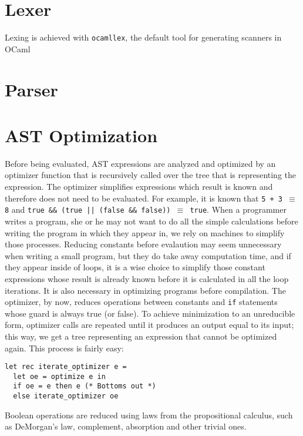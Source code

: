 \documentclass[a4paper, 11pt]{article}
\begin{document}
\begin{multicols}{2}

\section{Lexer}

Lexing is achieved with \texttt{ocamllex}, the default tool for generating
scanners in OCaml

\section{Parser}

\section{AST Optimization}
Before being evaluated, AST expressions are analyzed and optimized by an
optimizer function that is recursively called over the tree that is representing
the expression. The optimizer simplifies expressions which result is known and
therefore does not need to be evaluated. For example, it is known that \texttt{5
+ 3 $\equiv$ 8} and \texttt{true \&\& (true || (false \&\& false)) $\equiv$
true}. When a programmer writes a program, she or he may not want to do all the
simple calculations before writing the program in which they appear in, we rely
on machines to simplify those processes. Reducing constants before evalaution
may seem unnecessary when writing a small program, but they do take away
computation time, and if they appear inside of loops, it is a wise choice to
simplify those constant expressions whose result is already known before it is
calculated in all the loop iterations. It is also necessary in optimizing
programs before compilation. The optimizer, by now, reduces operations between
constants and \texttt{if} statements whose guard is always true (or false). To
achieve minimization to an unreducible form, optimizer calls are repeated until
it produces an output equal to its input; this way, we get a tree representing
an expression that cannot be optimized again. This process is fairly easy:

\begin{lstlisting}[style=caml]
let rec iterate_optimizer e =
  let oe = optimize e in
  if oe = e then e (* Bottoms out *)
  else iterate_optimizer oe
\end{lstlisting}

Boolean operations are reduced using laws from the propositional calculus, such as DeMorgan's law, complement, absorption and other trivial ones.


\end{multicols}
\end{document}
